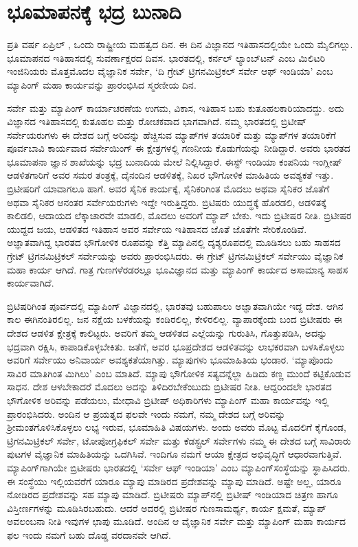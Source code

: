 
\chapter{ಭೂಮಾಪನಕ್ಕೆ ಭದ್ರ ಬುನಾದಿ}

ಪ್ರತಿ ವರ್ಷ ಏಪ್ರಿಲ್ ​, ಒಂದು ರಾಷ್ಟ್ರೀಯ ಮಹತ್ವದ ದಿನ. ಈ ದಿನ ವಿಜ್ಞಾನದ ಇತಿಹಾಸದಲ್ಲಿಯೇ ಒಂದು ಮೈಲಿಗಲ್ಲು. ಭೂಮಾಪನದ ಇತಿಹಾಸದಲ್ಲಿ ಸುವರ್ಣಾಕ್ಷರದ ದಿವಸ. ಭಾರತದಲ್ಲಿ, ಕರ್ನಲ್​ ಲ್ಯಾಂಬ್​ಟನ್​ ಎಂಬ ಮಿಲಿಟರಿ ಇಂಜಿನಿಯರು ಮೊತ್ತಮೊದಲ ವೈಜ್ಞಾನಿಕ ಸರ್ವೇ, ‘ದಿ ಗ್ರೇಟ್​ ಟ್ರಿಗನಮಿಟ್ರಿಕಲ್​ ಸರ್ವೇ ಆಫ್​ ಇಂಡಿಯಾ’ ಎಂಬ ಮ್ಯಾಪಿಂಗ್​ ಮಹಾ ಕಾರ್ಯವನ್ನು ಪ್ರಾರಂಭಿಸಿದ ಸ್ಮರಣೀಯ ದಿನ.

ಸರ್ವೇ ಮತ್ತು ಮ್ಯಾಪಿಂಗ್​ ಕಾರ್ಯಾಚರಣೆಯ ಉಗಮ, ವಿಕಾಸ, ಇತಿಹಾಸ ಬಹು ಕುತೂಹಲಕಾರಿಯಾದದ್ದು. ಅದು ವಿಜ್ಞಾನದ ಇತಿಹಾಸದಲ್ಲಿ ಕುತೂಹಲ ಮತ್ತು ರೋಚಕವಾದ ಭಾಗವಾಗಿದೆ. ನಮ್ಮ ಭಾರತದಲ್ಲಿ ಬ್ರಿಟೀಷ್​ ಸರ್ವೇಯರುಗಳು ಈ ದೇಶದ ಬಗ್ಗೆ ಅರಿವನ್ನು ಹೆಚ್ಚಿಸುವ ಮ್ಯಾಪ್​ಗಳ ತಯಾರಿಕೆ ಮತ್ತು ಮ್ಯಾಪ್​ಗಳ ತಯಾರಿಕೆಗೆ ಪೂರ್ವಬಾವಿ ಕಾರ್ಯವಾದ ಸರ್ವೇಯಿಂಗ್​ ಈ ಕ್ಷೇತ್ರಗಳಲ್ಲಿ ಗಣನೀಯ ಕೊಡುಗೆಯನ್ನು ನೀಡಿದ್ದಾರೆ. ಅವರು ಭಾರತದ ಭೂಮಾಪನಾ ಜ್ಞಾನ ಶಾಖೆಯನ್ನು ಭದ್ರ ಬುನಾದಿಯ ಮೇಲೆ ನಿಲ್ಲಿಸಿದ್ದಾರೆ. ಈಸ್ಟ್​ ಇಂಡಿಯಾ ಕಂಪನಿಯ ಇಂಗ್ಲೀಷ್​ ಆಡಳಿತಗಾರಿಗೆ ಅವರ ಸಮರ ತಂತ್ರಕ್ಕೆ, ದೈನಂದಿನ ಆಡಳಿತಕ್ಕೆ, ನಿಖರ ಭೌಗೋಳಿಕ ಮಾಹಿತಿಯ ಅವಶ್ಯಕತೆ ಇತ್ತು. ಬ್ರಿಟೀಷರಿಗೆ ಯಾವಾಗಲೂ ಹಾಗೆ. ಅವರ ಸೈನಿಕ ಕಾರ್ಯಕ್ಕೆ, ಸೈನಿಕರಿಗಿಂತ ಮೊದಲು ಅಥವಾ ಸೈನಿಕರ ಜೊತೆಗೆ ಅಥವಾ ಸೈನಿಕರ ಆನಂತರ ಸರ್ವೇಯರುಗಳು ಇದ್ದೇ ಇರುತ್ತಿದ್ದರು. ಬ್ರಿಟಿಷರು ಯುದ್ಧಕ್ಕೆ ಹೊರಡಲಿ, ಆಡಳಿತಕ್ಕೆ ಕಾಲಿಡಲಿ, ಆದಾಯದ ಲೆಕ್ಕಾಚಾರವೇ ಮಾಡಲಿ, ಮೊದಲು ಅವರಿಗೆ ಮ್ಯಾಪ್​ ಬೇಕು. ಇದು ಬ್ರಿಟೀಷರ ನೀತಿ. ಬ್ರಿಟೀಷರ ಯುದ್ದದ ಜಯ, ಆಡಳಿತದ ಇತಿಹಾಸ ಅವರ ಸರ್ವೇಯ ಇತಿಹಾಸದ ಜೊತೆ ಜೊತೆಗೇ ಸೇರಿಕೊಂಡಿವೆ. ಅಜ್ಞಾತವಾಗಿದ್ದ ಭಾರತದ ಭೌಗೋಳಿಕ ರೂಪವನ್ನು ಕೆತ್ತಿ ಮ್ಯಾಪಿನಲ್ಲಿ ದೃಶ್ಯರೂಪದಲ್ಲಿ ಮೂಡಿಸಲು ಬಹು ಸಾಹಸದ ಗ್ರೇಟ್​ ಟ್ರಿಗನಮಿಟ್ರಿಕಲ್​ ಸರ್ವೇಯನ್ನು ಅವರು ಪ್ರಾರಂಭಿಸಿದರು. ಈ ಗ್ರೇಟ್​ ಟ್ರಿಗನಮಿಟ್ರಿಕಲ್​ ಸರ್ವೇಯು ವೈಜ್ಞಾನಿಕ ಮಹಾ ಕಾರ್ಯ ಆಗಿದೆ. ಗಾತ್ರ ಗುಣಗಳೆರಡರಲ್ಲೂ ಭೂವಿಜ್ಞಾನದ ಮತ್ತು ಮ್ಯಾಪಿಂಗ್​ ಕಾರ್ಯದ ಅಸಾಮಾನ್ಯ ಸಾಹಸ ಕಾರ್ಯವಾಗಿದೆ.

ಬ್ರಿಟಿಷರಿಗಿಂತ ಪೂರ್ವದಲ್ಲಿ ಮ್ಯಾಪಿಂಗ್​ ವಿಜ್ಞಾನದಲ್ಲಿ, ಭಾರತವು ಬಹುಪಾಲು ಅಜ್ಞಾತವಾಗಿಯೇ ಇದ್ದ ದೇಶ. ಆಗಿನ ಕಾಲ ಈಗಿನಂತಿರಲಿಲ್ಲ. ಜನ ನಕ್ಷೆಯ ಬಳಕೆಯನ್ನು ಕಂಡಿರಲಿಲ್ಲ, ಕೇಳಿರಲಿಲ್ಲ. ವ್ಯಾಪಾರಕ್ಕೆಂದು ಬಂದ ಬ್ರಿಟೀಷರು ಈ ದೇಶದ ಆಡಳಿತ ಕ್ಷೇತ್ರಕ್ಕೆ ಕಾಲಿಟ್ಟರು. ಅವರಿಗೆ ತಮ್ಮ ಆಡಳಿತದ ಎಲ್ಲೆಯನ್ನು ಗುರುತಿಸಿ, ಗೊತ್ತುಪಡಿಸಿ, ಅದನ್ನು ಭದ್ರವಾಗಿ ರಕ್ಷಿಸಿ, ಕಾಪಾಡಿಕೊಳ್ಳಬೇಕಿತು. ಜತೆಗೆ, ಅವರ ಭೂಪ್ರದೇಶದ ಆಡಳಿತವನ್ನು ಲಾಭಕರವಾಗಿ ಬಳಸಿಕೊಳ್ಳಲು ಅವರಿಗೆ ಸರ್ವೇಯು ಅನಿವಾರ್ಯ ಅವಶ್ಯಕತೆಯಾಗಿತ್ತು. ಮ್ಯಾಪುಗಳು ಭೂಮಾಹಿತಿಯ ಭಂಡಾರ. ‘ಮ್ಯಾಪೊಂದು ಸಾವಿರ ಮಾತಿಗಿಂತ ಮಿಗಿಲು’ ಎಂಬ ಮಾತಿದೆ. ಮ್ಯಾಪು ಭೌಗೋಳಿಕ ಸತ್ಯವನ್ನೆಲ್ಲಾ ಹಿಡಿದು ಕಣ್ಣ ಮುಂದೆ ಕಟ್ಟಿಕೊಡುವ ಸಾಧನ. ದೇಶ ಆಳಬೇಕಾದರೆ ಮೊದಲು ಅದನ್ನು ತಿಳಿದಿರಬೇಕೆಂಬುದು ಬ್ರಿಟೀಷರ ನೀತಿ. ಆದ್ದರಿಂದಲೇ ಭಾರತದ ಭೌಗೋಳಿಕ ಅರಿವನ್ನು ಪಡೆಯಲು, ಮೇಧಾವಿ ಬ್ರಿಟೀಷ್​ ಅಧಿಕಾರಿಗಳು ಮ್ಯಾಪಿಂಗ್​ ಮಹಾ ಕಾರ್ಯವನ್ನು ಇಲ್ಲಿ ಪ್ರಾರಂಭಿಸಿದರು. ಅಂದಿನ ಆ ಪ್ರಯತ್ನದ ಫಲವೇ ಇಂದು ನಮಗೆ, ನಮ್ಮ ದೇಶದ ಬಗ್ಗೆ ಅರಿವನ್ನು ಶ‍್ರೀಮಂತಗೊಳಿಸಿಕೊಳ್ಳಲು ಲಭ್ಯ ಇರುವ, ಭೂಮಾಹಿತಿ ವಿಷಯಗಳು. ಅಂದು ಅವರು ಮೊಟ್ಟ ಮೊದಲಿಗೆ ಕೈಗೊಂಡ, ಟ್ರಿಗನಮಿಟ್ರಿಕಲ್​ ಸರ್ವೇ, ಟೋಪೋಗ್ರಫಿಕಲ್​ ಸರ್ವೇ ಮತ್ತು ಕೆಡಸ್ಟ್ರಲ್​ ಸರ್ವೇಗಳು ನಮ್ಮ ಈ ದೇಶದ ಬಗ್ಗೆ ಸಾವಿರಾರು ಪುಟಗಳ ವೈಜ್ಞಾನಿಕ ಮಾಹಿತಿಯನ್ನು ಒದಗಿಸಿವೆ. ಇಂದಿಗೂ ನಮಗೆ ಆಯಾ ಕ್ಷೇತ್ರದ ಅಭಿವೃದ್ಧಿಗೆ ಆಧಾರವಾಗುತ್ತಿವೆ. ಮ್ಯಾಪಿಂಗ್​ಗಾಗಿಯೇ ಬ್ರಿಟೀಷರು ಭಾರತದಲ್ಲಿ ‘ಸರ್ವೇ ಆಫ್​ ಇಂಡಿಯಾ’ ಎಂಬ ಮ್ಯಾಪಿಂಗ್​ ಸಂಸ್ಥೆಯನ್ನು ಸ್ಥಾಪಿಸಿದರು. ಈ ಸಂಸ್ಥೆಯು ಇಲ್ಲಿಯವರೆಗೆ ಯಾರೂ ಮ್ಯಾಪು ಮಾಡಿರದ ಪ್ರದೇಶವನ್ನು ಮ್ಯಾಪು ಮಾಡಿದೆ. ಅಷ್ಟೇ ಅಲ್ಲ, ಯಾರೂ ನೋಡಿರದ ಪ್ರದೇಶವನ್ನು ಸಹ ಮ್ಯಾಪು ಮಾಡಿದೆ. ಬ್ರಿಟೀಷರು ಮ್ಯಾಪ್​ನಲ್ಲಿ ಬ್ರಿಟೀಷ್​ ಇಂಡಿಯಾದ ಚಿತ್ರಣ ಹಾಗೂ ವಿಸ್ತೀರ್ಣಗಳನ್ನು ಮೂಡಿಸಿರಬಹುದು. ಆದರೆ ಅದರಲ್ಲಿ ಬ್ರಿಟೀಷರ ಗುಣಸಾಮರ್ಥ್ಯ, ಕಾರ್ಯ ಕ್ಷಮತೆ, ಮ್ಯಾಪ್​ ಅವಲಂಬನಾ ನೀತಿ ಇವುಗಳ ಛಾಪು ಮೂಡಿದೆ. ಅಂದಿನ ಆ ವೈಜ್ಞಾನಿಕ ಸರ್ವೇ ಮತ್ತು ಮ್ಯಾಪಿಂಗ್​ ಮಹಾ ಕಾರ್ಯದ ಫಲ ಇಂದು ನಮಗೆ ಬಹು ದೊಡ್ಡ ವರದಾನವೇ ಆಗಿದೆ.

